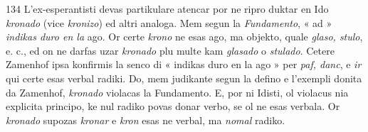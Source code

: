 \begin{VUpage}[138]{134}
L'ex-esperantisti devas partikulare atencar por ne ripro\cc
duktar en Ido \textit{kronado} (vice \textit{kronizo}) ed altri analoga. Mem\nl
segun la \textit{Fundamento}, « ad » \textit{indikas duro en la} ago. Or certe\nl
\textit{krono} ne esas ago, ma objekto, quale \textit{glaso, stulo}, e. c., ed on\nl
ne darfas uzar \textit{kronado} plu multe kam \textit{glasado} o \textit{stulado}.\nl
Cetere Zamenhof ipsa konfirmis la senco di « indikas duro\nl
en la ago » per \textit{paf, danc}, e \textit{ir} qui certe esas verbal radiki.\nl
Do, mem judikante segun la defino e l'exempli donita da\nl
Zamenhof, \textit{kronado} violacas la Fundamento. E, por ni\nl
Idisti, ol violacus nia explicita principo, ke nul radiko povas\nl
donar verbo, se ol ne esas verbala. Or \textit{kronado} supozas \textit{kronar}\nl
e \textit{kron} esas ne verbal, ma \textit{nomal} radiko.
\end{VUpage}

